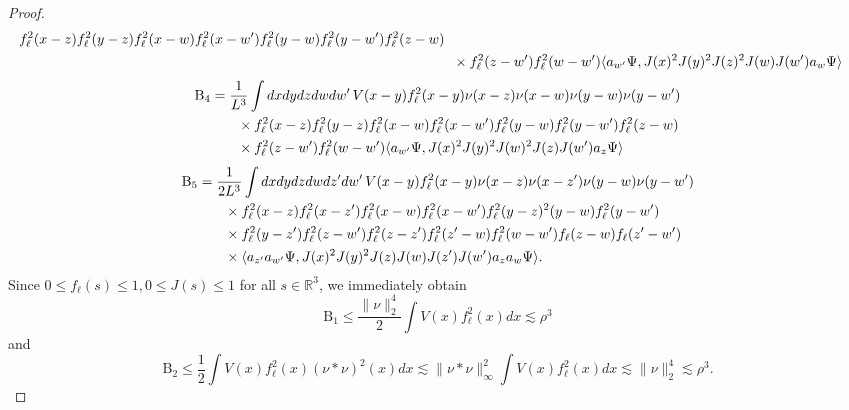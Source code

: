 \documentclass[a4paper,11pt]{article}
\def\bR{\mathbb{R}}
\numberwithin{equation}{section}
\begin{document}
\begin{proof}
\[\begin{split}
f_\ell^2(x-z) f_\ell^2 (y-z) f_\ell^2 (x-w) f_\ell^2 (x-w') f_\ell^2 (y-w) f_\ell^2 (y-w') f_\ell^2 (z-w) \\ &\hspace{.2cm} \times f_\ell^2 (z-w') f_\ell^2 (w-w') \langle a_{w'} \Psi, J(x)^2 J(y)^2 J(z)^2 J(w) J(w') a_w \Psi \rangle \end{split} \]
\[ \begin{split} \text{B}_4 = \; &\frac{1}{L^3}  \int dx dy dz dw dw' \, V(x-y) f_\ell^2 (x-y) \nu (x-z) \nu (x-w) \nu (y-w) \nu (y-w') \\ &\hspace{.2cm} \times 
f_\ell^2 (x-z)   f_\ell^2 (y-z) f_\ell^2 (x-w) f_\ell^2 (x-w') f_\ell^2 (y-w) f_\ell^2 (y-w') f_\ell^2 (z-w)  \\ &\hspace{.2cm} \times f_\ell^2 (z-w') f_\ell^2 (w-w') \langle a_{w'} \Psi, J(x)^2 J(y)^2 J(w)^2 J(z) J(w') a_z \Psi \rangle  \end{split} \]
\[ \begin{split} \text{B}_5 = \; &\frac{1}{2L^3} \int dx dy dz dw dz' dw' \, V(x-y) f_\ell^2 (x-y) \nu (x-z) \nu (x-z') \nu (y-w) \nu (y-w')  \\ &\hspace{.2cm} \times 
f_\ell^2 (x-z) f_\ell^2 (x-z') f_\ell^2 (x-w)  f_\ell^2 (x-w')  f_\ell^2 (y-z) ^2 (y-w) f_\ell^2 (y-w') \\ &\hspace{.2cm} \times f_\ell^2 (y-z') f_\ell^2 (z-w') f_\ell^2 (z-z') f_\ell^2 (z'-w) f_\ell^2 (w-w') f_\ell(z-w) f_\ell(z'-w')  \\ &\hspace{.2cm} \times \langle a_{z'} a_{w'} \Psi , J (x)^2 J(y)^2 J(z) J(w) J(z') J(w') a_z a_w \Psi \rangle .
 \end{split} \]
Since $0 \leq f_\ell(s) \leq 1, 0 \leq J(s) \leq 1$ for all $s \in \bR^3$, we immediately obtain 
\[ \text{B}_1 \leq \frac{\| \nu \|_2^4}{2} \int V(x) f_\ell^2 (x) dx \lesssim \rho^3 \]
and 
\[ \text{B}_2 \leq \frac{1}{2} \int V(x) f_\ell^2 (x) (\nu * \nu)^2 (x) dx \lesssim \| \nu * \nu \|_\infty^2 \int V(x) f_\ell^2(x)dx \lesssim \| \nu \|_2^4 \lesssim \rho^3.  \]


\end{proof}
\end{document}
